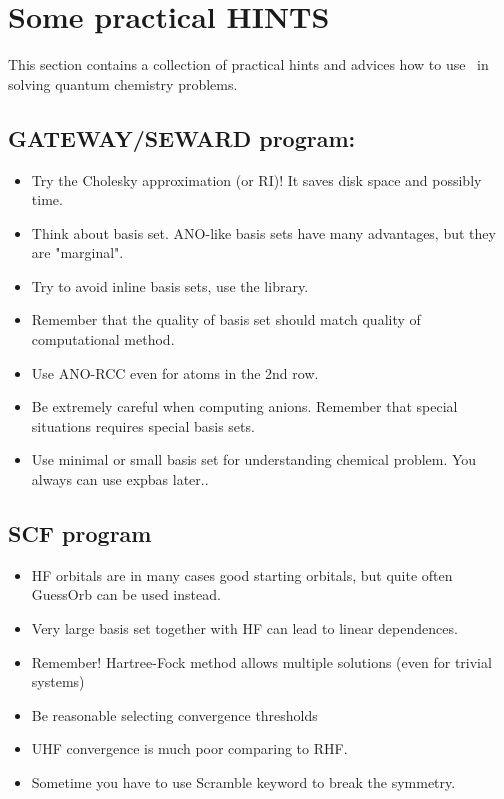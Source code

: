 
\section{Some practical HINTS} 
\label{TUT:sec:hints}

This section contains a collection of practical hints 
and advices how to 
use \molcas\ in solving quantum chemistry problems.


\subsection{GATEWAY/SEWARD program:} 
\begin{itemize}
\item Try the Cholesky approximation (or RI)! 
It saves disk space and possibly time. 
\item Think about basis set. ANO-like basis sets have many advantages,
but they are "marginal". 
\item Try to avoid inline basis sets, use the library.
\item Remember that the quality of basis set should match quality of
computational method. 
\item Use ANO-RCC even for atoms in the 2nd row.
\item Be extremely careful when computing anions.
Remember that special situations requires special basis sets.
\item Use minimal or small basis set for understanding chemical problem.
You always can use expbas later..
\end{itemize}


\subsection{SCF program}
\begin{itemize}
\item HF orbitals are in many cases good starting orbitals, 
but quite often GuessOrb can be used instead.
\item Very large basis set together with HF can lead to linear dependences.
\item Remember! Hartree-Fock method allows multiple solutions (even for trivial
systems)
\item Be reasonable selecting convergence thresholds
\item UHF convergence is much poor comparing to RHF. 
\item Sometime you have to use Scramble keyword to break the symmetry.
\end{itemize}

